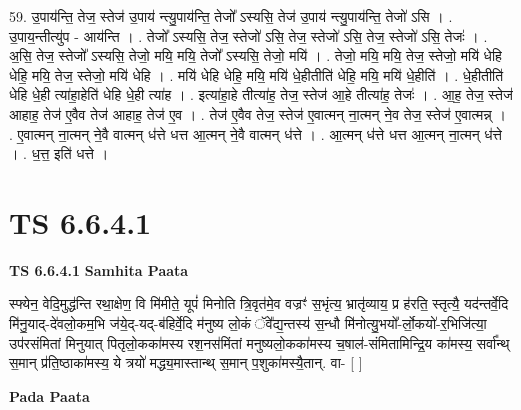 \documentclass[17pt]{extarticle}
\begin{document}
59. उ॒पाय॑न्ति॒ तेज॒ स्तेज॑ उ॒पाय॑ न्त्यु॒पाय॑न्ति॒ तेजो᳚ ऽस्यसि॒ तेज॑ उ॒पाय॑ न्त्यु॒पाय॑न्ति॒ तेजो॑ ऽसि । . उ॒पाय॒न्तीत्यु॑प - आय॑न्ति । . तेजो᳚ ऽस्यसि॒ तेज॒ स्तेजो॑ ऽसि॒ तेज॒ स्तेजो॑ ऽसि॒ तेज॒ स्तेजो॑ ऽसि॒ तेजः॑ । . अ॒सि॒ तेज॒ स्तेजो᳚ ऽस्यसि॒ तेजो॒ मयि॒ मयि॒ तेजो᳚ ऽस्यसि॒ तेजो॒ मयि॑ । . तेजो॒ मयि॒ मयि॒ तेज॒ स्तेजो॒ मयि॑ धेहि धेहि॒ मयि॒ तेज॒ स्तेजो॒ मयि॑ धेहि । . मयि॑ धेहि धेहि॒ मयि॒ मयि॑ धे॒हीतीति॑ धेहि॒ मयि॒ मयि॑ धे॒हीति॑ । . धे॒हीतीति॑ धेहि धे॒ही त्या॑हा॒हेति॑ धेहि धे॒ही त्या॑ह । . इत्या॑हा॒हे तीत्या॑ह॒ तेज॒ स्तेज॑ आ॒हे तीत्या॑ह॒ तेजः॑ । . आ॒ह॒ तेज॒ स्तेज॑ आहाह॒ तेज॑ ए॒वैव तेज॑ आहाह॒ तेज॑ ए॒व । . तेज॑ ए॒वैव तेज॒ स्तेज॑ ए॒वात्मन् ना॒त्मन् ने॒व तेज॒ स्तेज॑ ए॒वात्मन्न् । . ए॒वात्मन् ना॒त्मन् ने॒वै वात्मन् ध॑त्ते धत्त आ॒त्मन् ने॒वै वात्मन् ध॑त्ते । . आ॒त्मन् ध॑त्ते धत्त आ॒त्मन् ना॒त्मन् ध॑त्ते । . ध॒त्त॒ इति॑ धत्ते । \newline
\pagebreak
{}

\section{ TS 6.6.4.1 }

\textbf{TS 6.6.4.1 } \newline
\textbf{Samhita Paata} \newline

स्फ्येन॒ वेदि॒मुद्ध॑न्ति रथा॒क्षेण॒ वि मि॑मीते॒ यूपं॑ मिनोति त्रि॒वृत॑मे॒व वज्रꣳ॑ स॒भृंत्य॒ भ्रातृ॑व्याय॒ प्र ह॑रति॒ स्तृत्यै॒ यद॑न्तर्वे॒दि मि॑नु॒याद्-दे॑वलो॒कम॒भि ज॑ये॒द्-यद्-ब॑हिर्वे॒दि म॑नुष्य लो॒कं ॅवे᳚द्य॒न्तस्य॑ स॒न्धौ मि॑नोत्यु॒भयो᳚-र्लो॒कयो॑-र॒भिजि॑त्या॒ उप॑रसंमितां मिनुयात् पितृलो॒कका॑मस्य रश॒नस॑मिंतां मनुष्यलो॒कका॑मस्य च॒षाल॑-संमितामिन्द्रि॒य का॑मस्य॒ सर्वा᳚न्थ् स॒मान् प्र॑ति॒ष्ठाका॑मस्य॒ ये त्रयो॑ मद्ध्य॒मास्तान्थ् स॒मान् प॒शुका॑मस्यै॒तान्. वा- [  ] \newline

\textbf{Pada Paata} \newline
\end{document}
